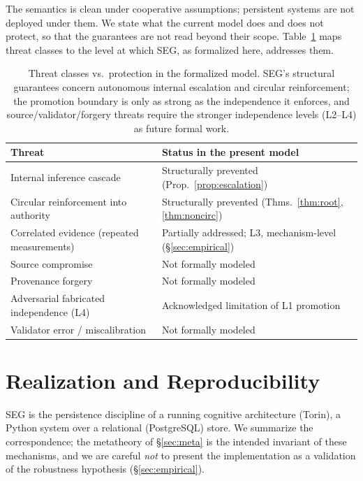 \documentclass[11pt]{article}
\theoremstyle{plain}
\theoremstyle{definition}
\begin{document}
The semantics is clean under cooperative assumptions; persistent systems are not
deployed under them. We state what the current model does and does not protect,
so that the guarantees are not read beyond their scope. Table~\ref{tab:threat}
maps threat classes to the level at which SEG, as formalized here, addresses them.

\begin{table}[t]
\centering
\small
\begin{tabular}{l l}
\hline
Threat & Status in the present model\\
\hline
Internal inference cascade & Structurally prevented (Prop.~\ref{prop:escalation})\\
Circular reinforcement into authority & Structurally prevented (Thms.~\ref{thm:root},\ref{thm:noncirc})\\
Correlated evidence (repeated measurements) & Partially addressed; L3, mechanism-level (\S\ref{sec:empirical})\\
Source compromise & Not formally modeled\\
Provenance forgery & Not formally modeled\\
Adversarial fabricated independence (L4) & Acknowledged limitation of L1 promotion\\
Validator error / miscalibration & Not formally modeled\\
\hline
\end{tabular}
\caption{Threat classes vs.\ protection in the formalized model. SEG's structural
guarantees concern autonomous internal escalation and circular reinforcement; the
promotion boundary is only as strong as the independence it enforces, and
source/validator/forgery threats require the stronger independence levels
(L2--L4) as future formal work.}
\label{tab:threat}
\end{table}

\section{Realization and Reproducibility}
\label{sec:impl}

SEG is the persistence discipline of a running cognitive architecture (Torin), a
Python system over a relational (PostgreSQL) store. We summarize the
correspondence; the metatheory of \S\ref{sec:meta} is the intended invariant of
these mechanisms, and we are careful \emph{not} to present the implementation as a
validation of the robustness hypothesis (\S\ref{sec:empirical}).
\end{document}

